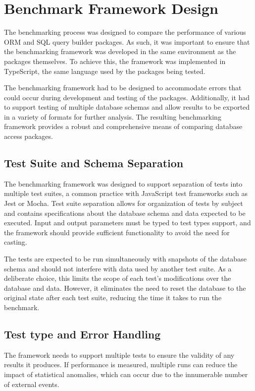 \chapter{Benchmark Framework Design}

The benchmarking process was designed to compare the performance of various ORM
and SQL query builder packages. As such, it was important to ensure that the
benchmarking framework was developed in the same environment as the packages
themselves. To achieve this, the framework was implemented in TypeScript, the
same language used by the packages being tested.

The benchmarking framework had to be designed to accommodate errors that could
occur during development and testing of the packages. Additionally, it had to
support testing of multiple database schemas and allow results to be exported in
a variety of formats for further analysis. The resulting benchmarking framework
provides a robust and comprehensive means of comparing database access packages.

\section{Test Suite and Schema Separation}

The benchmarking framework was designed to support separation of tests into
multiple test suites, a common practice with JavaScript test frameworks such as
Jest or Mocha. Test suite separation allows for organization of tests by subject
and contains specifications about the database schema and data expected to be
executed. Input and output parameters must be typed to test types support, and
the framework should provide sufficient functionality to avoid the need for
casting.

The tests are expected to be run simultaneously with snapshots of the database
schema and should not interfere with data used by another test suite. As a
deliberate choice, this limits the scope of each test's modifications over the
database and data. However, it eliminates the need to reset the database to the
original state after each test suite, reducing the time it takes to run the
benchmark.

\section{Test type and Error Handling}

The framework needs to support multiple tests to ensure the validity of any
results it produces. If performance is measured, multiple runs can reduce the
impact of statistical anomalies, which can occur due to the innumerable number
of external events.

